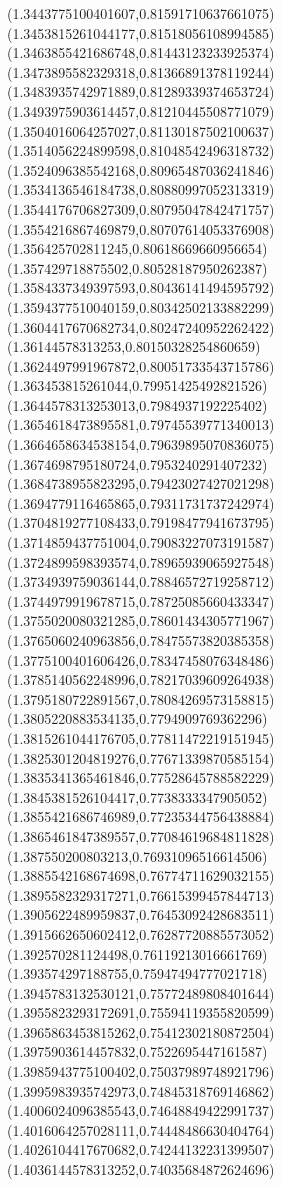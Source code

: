 \documentclass[12pt]{article}
\theoremstyle{plain}
\theoremstyle{definition}
\theoremstyle{remark}
\begin{document}
\begin{figure}
{  (1.3443775100401607,0.81591710637661075)%
  (1.3453815261044177,0.81518056108994585)%
  (1.3463855421686748,0.81443123233925374)%
  (1.3473895582329318,0.81366891378119244)%
  (1.3483935742971889,0.81289339374653724)%
  (1.3493975903614457,0.81210445508771079)%
  (1.3504016064257027,0.81130187502100637)%
  (1.3514056224899598,0.81048542496318732)%
  (1.3524096385542168,0.80965487036241846)%
  (1.3534136546184738,0.80880997052313319)%
  (1.3544176706827309,0.80795047842471757)%
  (1.3554216867469879,0.80707614053376908)%
  (1.356425702811245,0.80618669660956654)%
  (1.357429718875502,0.80528187950262387)%
  (1.3584337349397593,0.80436141494595792)%
  (1.3594377510040159,0.80342502133882299)%
  (1.3604417670682734,0.80247240952262422)%
  (1.36144578313253,0.80150328254860659)%
  (1.3624497991967872,0.80051733543715786)%
  (1.363453815261044,0.79951425492821526)%
  (1.3644578313253013,0.7984937192225402)%
  (1.3654618473895581,0.79745539771340013)%
  (1.3664658634538154,0.79639895070836075)%
  (1.3674698795180724,0.7953240291407232)%
  (1.3684738955823295,0.79423027427021298)%
  (1.3694779116465865,0.79311731737242974)%
  (1.3704819277108433,0.79198477941673795)%
  (1.3714859437751004,0.79083227073191587)%
  (1.3724899598393574,0.78965939065927548)%
  (1.3734939759036144,0.78846572719258712)%
  (1.3744979919678715,0.78725085660433347)%
  (1.3755020080321285,0.78601434305771967)%
  (1.3765060240963856,0.78475573820385358)%
  (1.3775100401606426,0.78347458076348486)%
  (1.3785140562248996,0.78217039609264938)%
  (1.3795180722891567,0.78084269573158815)%
  (1.3805220883534135,0.7794909769362296)%
  (1.3815261044176705,0.77811472219151945)%
  (1.3825301204819276,0.77671339870585154)%
  (1.3835341365461846,0.77528645788582229)%
  (1.3845381526104417,0.7738333347905052)%
  (1.3855421686746989,0.77235344756438884)%
  (1.3865461847389557,0.77084619684811828)%
  (1.387550200803213,0.76931096516614506)%
  (1.3885542168674698,0.76774711629032155)%
  (1.3895582329317271,0.76615399457844713)%
  (1.3905622489959837,0.76453092428683511)%
  (1.3915662650602412,0.76287720885573052)%
  (1.392570281124498,0.76119213016661769)%
  (1.393574297188755,0.75947494777021718)%
  (1.3945783132530121,0.75772489808401644)%
  (1.3955823293172691,0.75594119355820599)%
  (1.3965863453815262,0.75412302180872504)%
  (1.3975903614457832,0.7522695447161587)%
  (1.3985943775100402,0.75037989748921796)%
  (1.3995983935742973,0.74845318769146862)%
  (1.4006024096385543,0.74648849422991737)%
  (1.4016064257028111,0.74448486630404764)%
  (1.4026104417670682,0.74244132231399507)%
  (1.4036144578313252,0.74035684872624696)%
}
\end{figure}
\end{document}
